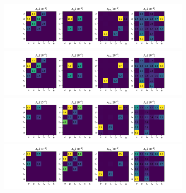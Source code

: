 \begin{frame}{}%
    \begin{center}
        \includegraphics[width=0.7\textwidth]{chapters/Analysis/sectionStatisticalAnalysis/figures/acc_mu1b.png}
        \includegraphics[width=0.7\textwidth]{chapters/Analysis/sectionStatisticalAnalysis/figures/acc_mu2b.png}
        \includegraphics[width=0.7\textwidth]{chapters/Analysis/sectionStatisticalAnalysis/figures/acc_e1b.png}
        \includegraphics[width=0.7\textwidth]{chapters/Analysis/sectionStatisticalAnalysis/figures/acc_e2b.png}
    \end{center}
\end{frame}



